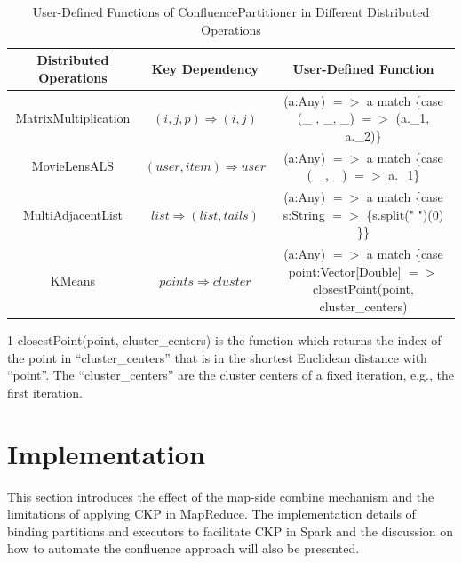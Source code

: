 \documentclass[10pt,journal,compsoc]{IEEEtran}
\begin{document}
\begin{table}[!t]
\begin{threeparttable}[b]
\renewcommand{\arraystretch}{1}
\caption{User-Defined Functions of ConfluencePartitioner in Different Distributed Operations}
\label{table:code}
\centering
\begin{tabularx}{0.98\textwidth}{ c || c |c  }
\hline
\textbf{Distributed Operations} & \textbf{Key Dependency} & \textbf{User-Defined Function} \\
\hline
MatrixMultiplication & $(i,j,p) \Rightarrow (i,j)$ & (a:Any) $=>$ a match \{case (\_ , \_, \_) $=>$ (a.\_1, a.\_2)\}\\
\hline
MovieLensALS  &$(user,item) \Rightarrow user$ & (a:Any) $=>$ a match \{case (\_ , \_) $=>$ a.\_1\} \\%
\hline
MultiAdjacentList  & $list \Rightarrow (list, tails)$ & (a:Any) $=>$ a match \{case s:String $=>$ \{s.split(" ")(0) \}\}\\
\hline
KMeans & $points \Rightarrow cluster$ & (a:Any) $=>$ a match \{case point:Vector[Double] $=>$ closestPoint(point, cluster\_centers)\tnote{1}\\
\hline
\end{tabularx}
\begin{tablenotes}
    \item[1] closestPoint(point, cluster\_centers) is the function which returns the index of the point in ``cluster\_centers'' that is in the shortest Euclidean distance with ``point''. The ``cluster\_centers'' are the cluster centers of a fixed iteration, e.g., the first iteration. 
  \end{tablenotes}
\end{threeparttable}
\end{table}

\section{Implementation}\label{section:implement}
This section introduces the effect of the map-side combine mechanism and the
limitations of applying CKP in MapReduce.
The implementation details of binding partitions and executors to
facilitate CKP in Spark and the discussion on how to automate
the confluence approach will also be presented.
\end{document}
